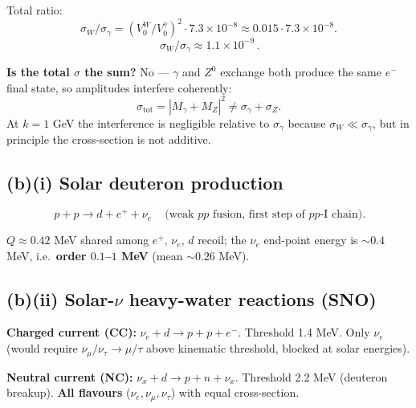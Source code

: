 \documentclass[11pt]{article}
\begin{document}
Total ratio:
\[ \sigma_W/\sigma_\gamma = (V_0^W/V_0^\gamma)^2\cdot 7.3\times 10^{-8} \approx 0.015\cdot 7.3\times 10^{-8}. \]
\[ \boxed{\,\sigma_W/\sigma_\gamma \approx 1.1\times 10^{-9}\,}. \]

\textbf{Is the total $\sigma$ the sum?} No --- $\gamma$ and $Z^0$ exchange both produce the same $e^-$ final state, so amplitudes interfere coherently:
\[ \sigma_\text{tot} = |M_\gamma + M_Z|^2 \neq \sigma_\gamma + \sigma_Z. \]
At $k=1$ GeV the interference is negligible relative to $\sigma_\gamma$ because $\sigma_W\ll\sigma_\gamma$, but in principle the cross-section is not additive.

\subsection*{(b)(i) Solar deuteron production}

\[ \boxed{\,p + p \to d + e^+ + \nu_e\,}\quad \text{(weak $pp$ fusion, first step of $pp$-I chain)}. \]

$Q\approx 0.42$ MeV shared among $e^+$, $\nu_e$, $d$ recoil; the $\nu_e$ end-point energy is $\sim 0.4$ MeV, i.e.\ \textbf{order $0.1$--$1$ MeV} (mean $\sim 0.26$ MeV).

\subsection*{(b)(ii) Solar-$\nu$ heavy-water reactions (SNO)}

\textbf{Charged current (CC):} $\nu_e + d \to p + p + e^-$. Threshold 1.4 MeV. Only $\nu_e$ (would require $\nu_\mu/\nu_\tau\to\mu/\tau$ above kinematic threshold, blocked at solar energies).

\begin{center}
\end{center}

\textbf{Neutral current (NC):} $\nu_x + d \to p + n + \nu_x$. Threshold 2.2 MeV (deuteron breakup). \textbf{All flavours} ($\nu_e,\nu_\mu,\nu_\tau$) with equal cross-section.
\end{document}

